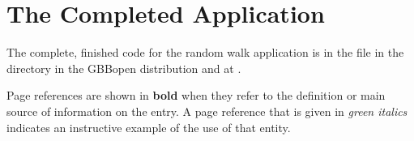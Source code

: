 \documentclass[10pt,twoside,english,pdftex]{article}
\begin{document}
\T\markright{}%
\T\pagestyle{plain}
\T\cleardoublepage
\W{}
\T\pagestyle{fancy}
\T\thispagestyle{fancybottom}
\T\renewcommand{\headrulewidth}{0pt}
\section{The Completed Application}
\label{sec:completed}%

The complete, finished code for the random walk application is in the
 file in the 
directory in the GBBopen distribution and at
.


\T\markright{}
\T\pagestyle{plain}
\T\cleardoublepage
\W{}
\T\pagestyle{fancy}
\T\thispagestyle{fancybottom}
\T\fancyhead[er,ol]{}
\T\small
\T{}%

\T\twocolumn
%
\texonly{\section*{\indexname}}%
% 
Page references are shown in \textbf{bold} when they refer to the definition
or main source of information on the entry. A page reference that is given in
\textit{\textcolor{verydarkgreen}{green italics}\/} indicates an instructive
example of the use of that entity.
%
\W\\~\\
\T\bigskip
%
\texorhtml{}{\htmlprintindex}

\end{document}
